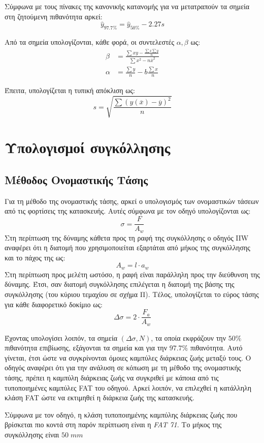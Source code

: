 \documentclass{article}
\begin{document}
Σύμφωνα με τους πίνακες της κανονικής κατανομής για να μετατραπούν τα σημεία στη ζητούμενη πιθανότητα αρκεί:
\begin{equation}
    \hat{y}_{97.7\%} = \hat{y}_{50\%} - 2.27s
\end{equation}

Από τα σημεία υπολογίζονται, κάθε φορά, οι συντελεστές $\alpha, \beta$ ως:
\begin{align}
    \beta &= \frac{\sum xy - \frac{\sum x \sum y}{n}}{\sum x^2 -n\overline{x}^2}\\
    \alpha &= \frac{\sum y}{n} - b\frac{\sum x}{n}
\end{align} 

Έπειτα, υπολογίζεται η τυπική απόκλιση ως:
\begin{equation}
    s = \sqrt{\frac{\sum (y(\overline{x}) - \overline{y})^2}{n}}
\end{equation}




\section{Υπολογισμοί συγκόλλησης}
\subsection{Μέθοδος Ονομαστικής Τάσης}
Για τη μέθοδο της ονομαστικής τάσης, αρκεί ο υπολογισμός των ονομαστικών τάσεων από τις φορτίσεις της κατασκευής. Αυτές σύμφωνα με τον οδηγό υπολογίζονται ως:
\begin{equation}
    \sigma = \frac{F}{A_w}
\end{equation}
Στη περίπτωση της δύναμης κάθετα προς τη ραφή της συγκόλλησης ο οδηγός IIW αναφέρει ότι η διατομή που χρησιμοποιείται εξαρτάται από μήκος της συγκόλλησης και το πάχος της ως:
\begin{equation}
    A_w = l\cdot a_w
\end{equation}
Στη περίπτωση προς μελέτη ωστόσο, η ραφή είναι παράλληλη προς την διεύθυνση της δύναμης. Έτσι, σαν διατομή συγκόλλησης επιλέγεται η διατομή της βάσης της συγκόλλησης (του κύριου τεμαχίου σε σχήμα Π). Τέλος, υπολογίζεται το εύρος τάσης για κάθε διαφορετικό δοκίμιο ως:
\begin{equation}
    \Delta \sigma = 2\cdot \frac{F_a}{A_w}
\end{equation}

Έχοντας υπολογίσει λοιπόν, τα σημεία $(\Delta \sigma, N)$, τα οποία εκφράζουν την $50\%$ πιθανότητα επιβίωσης, εξάγονται τα σημεία και για την $97.7\%$ πιθανότητα. Αυτό γίνεται, έτσι ώστε να συγκρίνονται όμοιες καμπύλες διάρκειας ζωής μεταξύ τους. Ο οδηγός αναφέρει ότι για την ανάλυση σε κόπωση με τη μέθοδο της ονομαστικής τάσης, πρέπει η καμπύλη διάρκειας ζωής να συγκριθεί με κάποια από τις τυποποιημένες καμπύλες FAT του οδηγού. Αρκεί λοιπόν, να επιλεχθεί η κατάλληλη κλάση FAT ώστε να εκτιμηθεί η διάρκεια ζωής της κατασκευής.
\par Σύμφωνα με τον οδηγό, η κλάση τυποποιημένης καμπύλης διάρκειας ζωής που βρίσκεται πιο κοντά στη παρόν περίπτωση είναι η \textit{FAT 71}. Το μήκος της συγκόλλησης είναι $50\; mm$
\end{document}
